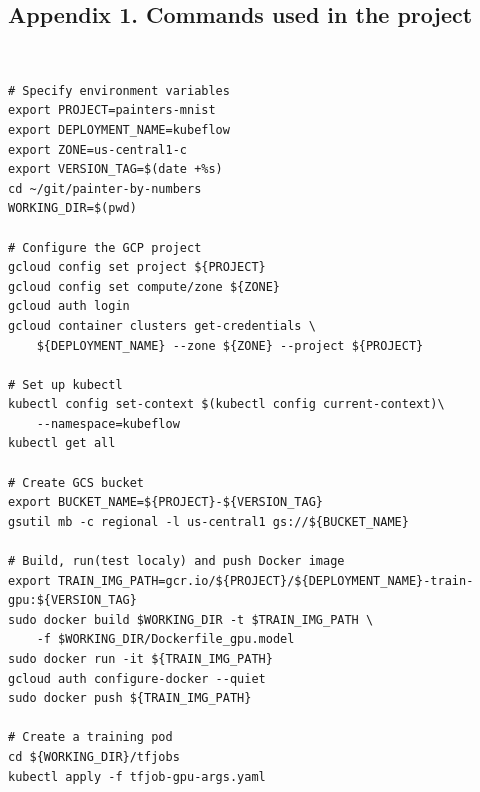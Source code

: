 \documentclass[
	12pt, %
]{fphw}
\begin{document}
\subsection*{Appendix 1. Commands used in the project}
\ \\
\begin{lstlisting}
# Specify environment variables
export PROJECT=painters-mnist
export DEPLOYMENT_NAME=kubeflow
export ZONE=us-central1-c
export VERSION_TAG=$(date +%s)
cd ~/git/painter-by-numbers
WORKING_DIR=$(pwd)

# Configure the GCP project
gcloud config set project ${PROJECT}
gcloud config set compute/zone ${ZONE}
gcloud auth login
gcloud container clusters get-credentials \
	${DEPLOYMENT_NAME} --zone ${ZONE} --project ${PROJECT}

# Set up kubectl
kubectl config set-context $(kubectl config current-context)\
	--namespace=kubeflow
kubectl get all

# Create GCS bucket
export BUCKET_NAME=${PROJECT}-${VERSION_TAG}
gsutil mb -c regional -l us-central1 gs://${BUCKET_NAME}

# Build, run(test localy) and push Docker image
export TRAIN_IMG_PATH=gcr.io/${PROJECT}/${DEPLOYMENT_NAME}-train-gpu:${VERSION_TAG}
sudo docker build $WORKING_DIR -t $TRAIN_IMG_PATH \
	-f $WORKING_DIR/Dockerfile_gpu.model
sudo docker run -it ${TRAIN_IMG_PATH}
gcloud auth configure-docker --quiet
sudo docker push ${TRAIN_IMG_PATH}

# Create a training pod
cd ${WORKING_DIR}/tfjobs
kubectl apply -f tfjob-gpu-args.yaml
\end{lstlisting}
\end{document}
